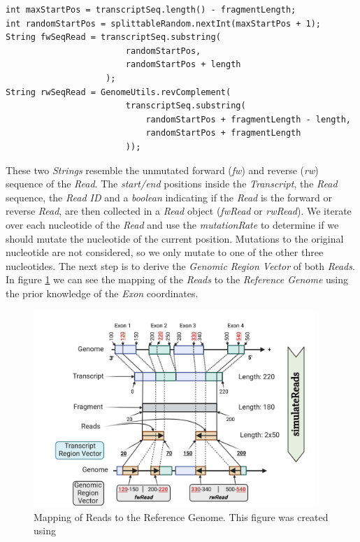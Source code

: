 \documentclass[12pt]{article}
\begin{document}
\begin{enumerate}
\begin{verbatim}
int maxStartPos = transcriptSeq.length() - fragmentLength;
int randomStartPos = splittableRandom.nextInt(maxStartPos + 1);
String fwSeqRead = transcriptSeq.substring(
                        randomStartPos, 
                        randomStartPos + length
                    );
String rwSeqRead = GenomeUtils.revComplement(
                        transcriptSeq.substring(
                            randomStartPos + fragmentLength - length, 
                            randomStartPos + fragmentLength
                        ));
       \end{verbatim}
		These two \textit{Strings} resemble the unmutated forward (\textit{fw}) and reverse (\textit{rw}) sequence of the \textit{Read}.
		The \textit{start/end} positions inside the \textit{Transcript}, the \textit{Read} sequence, the \textit{Read ID} and a \textit{boolean} indicating if the \textit{Read}
		is the forward or reverse \textit{Read}, are then collected in a \textit{Read} object (\textit{fwRead} or \textit{rwRead}).
		We iterate over each nucleotide of the \textit{Read} and use the \textit{mutationRate} to determine if we should mutate the nucleotide of the
		current position.
		Mutations to the original nucleotide are not considered, so we only mutate to one of the other three nucleotides.
		The next step is to derive the \textit{Genomic Region Vector} of both \textit{Reads}.
		In figure \ref{fig:mapping} we can see the mapping of the \textit{Reads} to the \textit{Reference Genome} using the prior knowledge of the \textit{Exon} coordinates.

		\begin{figure}[htpb]
			\centering
			\includegraphics[width=0.95\textwidth]{"./figures/Map.png"}
			\caption{Mapping of Reads to the Reference Genome. This figure was created using \cite{biorender}}
			\label{fig:mapping}
		\end{figure}


\end{enumerate}
\end{document}
